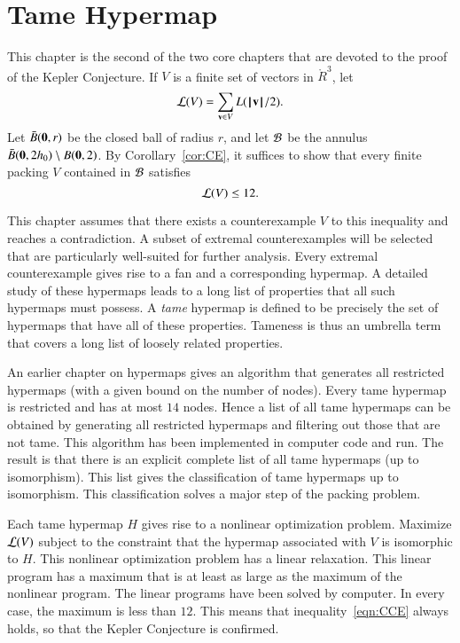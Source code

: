 


\chapter{Tame Hypermap}
%

\label{sec:tame}
%

\begin{summary}
This chapter is the second of the two core chapters that are devoted to the proof of the Kepler Conjecture.  If $V$ is a finite set of vectors in $\ring{R}^3$, let
$${\mathcal L}(V) = \sum_{{\mathbf v}\in V} L({{\hskip0.1em|\hskip-0.15em|\hskip0.1em}{\mathbf v}{\hskip0.1em|\hskip-0.15em|\hskip0.1em}}/2).$$
Let $\bar B({\mathbf 0},r)$ be the closed ball of radius $r$, and let ${\mathcal B}$ be the
annulus $\bar B({\mathbf 0},2h_0)\setminus B({\mathbf 0},2)$.
By Corollary~\ref{cor:CE}, it suffices to show that every finite packing $V$
contained in ${\mathcal B}$
satisfies
\begin{equation}\label{eqn:CCE}
{\mathcal L}(V) \le 12.
\end{equation}

This chapter assumes that there exists a counterexample $V$ to this inequality and reaches a contradiction.  A subset of extremal counterexamples will be selected that are particularly well-suited for further analysis.  Every extremal counterexample gives rise to a fan and a corresponding hypermap.  
A detailed study of these hypermaps leads to a long list of properties that all such hypermaps must
possess.   A {\it tame} hypermap is defined to be precisely the set of hypermaps that have all of these
properties.   Tameness is thus an umbrella term that covers a long list of loosely related properties.

An earlier chapter on hypermaps gives an algorithm that generates all restricted hypermaps (with a given bound on the number of nodes).   Every tame hypermap is restricted and has at most $14$ nodes.  Hence a list of all tame hypermaps can be obtained by generating all restricted hypermaps and filtering out those that are not tame.   This algorithm has been implemented in computer code and run.  The result is that there is an explicit complete list of all tame hypermaps (up to isomorphism).  
This list gives the classification of tame hypermaps up to isomorphism.   This classification solves a
major step of the packing problem.

Each tame hypermap $H$ gives rise to a nonlinear optimization problem.   Maximize ${\mathcal L}(V)$ subject to the constraint that the hypermap associated with  $V$ 
is isomorphic to $H$.  This nonlinear optimization problem has a linear relaxation.  This linear program has
a maximum that is at least as large as the maximum of the nonlinear program.  The linear programs
have been solved by computer.  In every case, the maximum is less than $12$.  This means
that inequality~\ref{eqn:CCE} always holds, so that the Kepler Conjecture is confirmed.
\end{summary}
%
%



